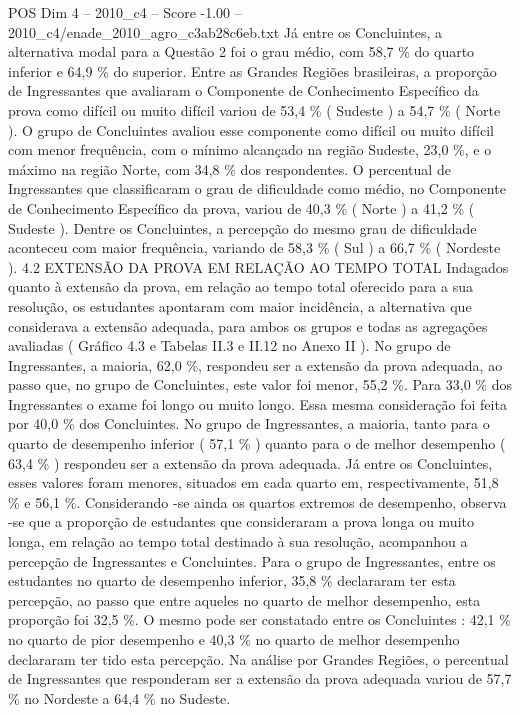 \begin{textsample}{POS Dim 4 – 2010\_c4 – Score -1.00 – 2010\_c4/enade\_2010\_agro\_c3ab28c6eb.txt}
Já entre os Concluintes, a alternativa modal para a Questão 2 foi o grau médio, com 58,7 \% do quarto inferior e 64,9 \% do superior.
Entre as Grandes Regiões brasileiras, a proporção de Ingressantes que avaliaram o Componente de Conhecimento Específico da prova como difícil ou muito difícil variou de 53,4 \% ( Sudeste ) a 54,7 \% ( Norte ).
O grupo de Concluintes avaliou esse componente como difícil ou muito difícil com menor frequência, com o mínimo alcançado na região Sudeste, 23,0 \%, e o máximo na região Norte, com 34,8 \% dos respondentes.
O percentual de Ingressantes que classificaram o grau de dificuldade como médio, no Componente de Conhecimento Específico da prova, variou de 40,3 \% ( Norte ) a 41,2 \% ( Sudeste ).
Dentre os Concluintes, a percepção do mesmo grau de dificuldade aconteceu com maior frequência, variando de 58,3 \% ( Sul ) a 66,7 \% ( Nordeste ). 4.2 EXTENSÃO DA PROVA EM RELAÇÃO AO TEMPO TOTAL Indagados quanto à extensão da prova, em relação ao tempo total oferecido para a sua resolução, os estudantes apontaram com maior incidência, a alternativa que considerava a extensão adequada, para ambos os grupos e todas as agregações avaliadas ( Gráfico 4.3 e Tabelas II.3 e II.12 no Anexo II ).
No grupo de Ingressantes, a maioria, 62,0 \%, respondeu ser a extensão da prova adequada, ao passo que, no grupo de Concluintes, este valor foi menor, 55,2 \%.
Para 33,0 \% dos Ingressantes o exame foi longo ou muito longo.
Essa mesma consideração foi feita por 40,0 \% dos Concluintes.
No grupo de Ingressantes, a maioria, tanto para o quarto de desempenho inferior ( 57,1 \% ) quanto para o de melhor desempenho ( 63,4 \% ) respondeu ser a extensão da prova adequada.
Já entre os Concluintes, esses valores foram menores, situados em cada quarto em, respectivamente, 51,8 \% e 56,1 \%.
Considerando -se ainda os quartos extremos de desempenho, observa -se que a proporção de estudantes que consideraram a prova longa ou muito longa, em relação ao tempo total destinado à sua resolução, acompanhou a percepção de Ingressantes e Concluintes.
Para o grupo de Ingressantes, entre os estudantes no quarto de desempenho inferior, 35,8 \% declararam ter esta percepção, ao passo que entre aqueles no quarto de melhor desempenho, esta proporção foi 32,5 \%.
O mesmo pode ser constatado entre os Concluintes : 42,1 \% no quarto de pior desempenho e 40,3 \% no quarto de melhor desempenho declararam ter tido esta percepção.
Na análise por Grandes Regiões, o percentual de Ingressantes que responderam ser a extensão da prova adequada variou de 57,7 \% no Nordeste a 64,4 \% no Sudeste.

\end{textsample}
